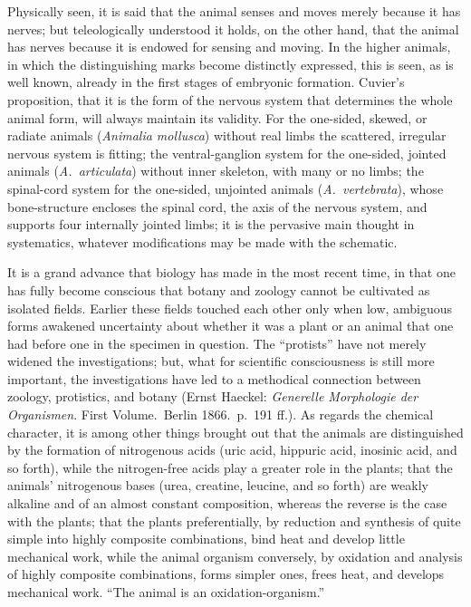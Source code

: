 \documentclass[12pt]{book}
\begin{document}
Physically seen, it is said that the animal senses and moves merely because it has nerves;
but teleologically understood it holds, on the other hand, that the animal has nerves
because it is endowed for sensing and moving. In the higher animals, in which the
distinguishing marks become distinctly expressed, this is seen, as is well known, already
in the first stages of embryonic formation. Cuvier's proposition, that it is the form of the
nervous system that determines the whole animal form, will always maintain its validity. For
the one-sided, skewed, or radiate animals (\textit{Animalia mollusca}) without real limbs
the scattered, irregular nervous system is fitting; the ventral-ganglion system for the
one-sided, jointed animals (\textit{A.\ articulata}) without inner skeleton, with many or no
limbs; the spinal-cord system for the one-sided, unjointed animals (\textit{A.\
vertebrata}), whose bone-structure encloses the spinal cord, the axis of the nervous system,
and supports four internally jointed limbs; it is the pervasive main thought in systematics,
whatever modifications may be made with the schematic.

It is a grand advance that biology has made in the most recent time, in that one has fully
become conscious that botany and zoology cannot be cultivated as isolated fields. Earlier
these fields touched each other only when low, ambiguous forms awakened uncertainty about
whether it was a plant or an animal that one had before one in the specimen in question. The
``protists'' have not merely widened the investigations; but, what for scientific
consciousness is still more important, the investigations have led to a methodical
connection between zoology, protistics, and botany (Ernst Haeckel: \textit{Generelle
Morphologie der Organismen}. First Volume.\ Berlin 1866.\ p.\ 191 ff.). As regards the
chemical character, it is among other things brought out that the animals are distinguished
by the formation of nitrogenous acids (uric acid, hippuric acid, inosinic acid, and so
forth), while the nitrogen-free acids play a greater role in the plants; that the animals'
nitrogenous bases (urea, creatine, leucine, and so forth) are weakly alkaline and of an
almost constant composition, whereas the reverse is the case with the plants; that the
plants preferentially, by reduction and synthesis of quite simple into highly composite
combinations, bind heat and develop little mechanical work, while the animal organism
conversely, by oxidation and analysis of highly composite combinations, forms simpler ones,
frees heat, and develops mechanical work. ``The animal is an oxidation-organism.''
\end{document}
